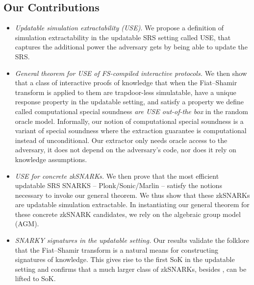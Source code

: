 \subsection{Our Contributions}
\begin{itemize}
\item 
\emph{Updatable simulation extractability (USE)}. 
We propose a definition of simulation extractability in the updatable SRS setting called USE, that captures the additional power the adversary gets by being able to update the SRS.%
    
  \item \emph{General theorem for USE of FS-compiled interactive protocols.} We
        then show that a class of interactive proofs of knowledge that when
        the Fiat--Shamir transform is applied to them are trapdoor-less simulatable, have a
        unique response property in the updatable setting, and satisfy a
        property we define called computational special soundness \emph{are USE
        out-of-the box} in the random oracle model. Informally, our notion of computational
        special soundness is a variant of special soundness where 
        the extraction guarantee is computational
        instead of unconditional. Our extractor only needs oracle access to the
        adversary, it does not depend on the adversary’s code, nor does it rely on
        knowledge assumptions.
    
\item
\emph{USE for concrete zkSNARKs.}
We then prove that the most efficient updatable SRS SNARKS -- Plonk/Sonic/Marlin -- satisfy the notions necessary to invoke our general theorem. We thus show that these zkSNARKs are updatable simulation extractable.
In instantiating our general theorem for these concrete zkSNARK candidates, we rely on the algebraic group model (AGM).

\item
  \emph{SNARKY signatures in the updatable setting.} Our results validate the folklore that the Fiat--Shamir transform is a natural means for constructing signatures of knowledge. This gives rise to the first SoK in the updatable setting and confirms that a much larger class of zkSNARKs, besides \cite{C:GroMal17}, can be lifted to SoK.
	
\end{itemize}



